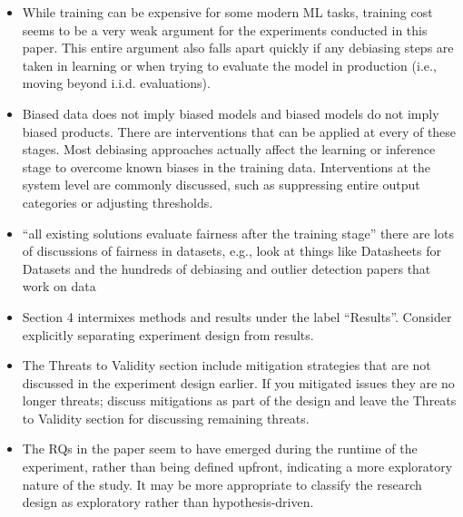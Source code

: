 \documentclass[conference]{IEEEtran}
\newcommand{\highlight}[1]{\begin{framed}%
  \noindent\emph{#1}
\end{framed}}
\begin{document}
\begin{itemize}

  \item While training can be expensive for some modern ML tasks,
    training cost seems to be a very weak argument for the experiments
    conducted in this paper. This entire argument also falls apart
    quickly if any debiasing steps are taken in learning or when
    trying to evaluate the model in production (i.e., moving beyond
    i.i.d. evaluations).



  \item Biased data does not imply biased models and biased models do
    not imply biased products. There are interventions that can be
    applied at every of these stages. Most debiasing approaches
    actually affect the learning or inference stage to overcome known
    biases in the training data. Interventions at the system level are
    commonly discussed, such as suppressing entire output categories
    or adjusting thresholds.
  \item ``all existing solutions evaluate fairness after the training
    stage'' there are lots of discussions of fairness in datasets,
    e.g., look at things like Datasheets for Datasets and the hundreds
    of debiasing and outlier detection papers that work on data
  \item Section 4 intermixes methods and results under the label
    ``Results''. Consider explicitly separating experiment design from
    results.
  \item The Threats to Validity section include mitigation strategies
    that are not discussed in the experiment design earlier. If you
    mitigated issues they are no longer threats; discuss mitigations
    as part of the design and leave the Threats to Validity section
    for discussing remaining threats.
  \item The RQs in the paper seem to have emerged during the runtime
    of the experiment, rather than being defined upfront, indicating
    a more exploratory nature of the study. It may be more appropriate
    to classify the research design as exploratory rather than
    hypothesis-driven.

\end{itemize}
\end{document}
